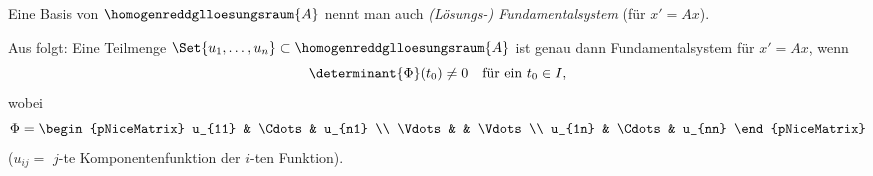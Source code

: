 \begin{definition*}
  Eine Basis von \( \homogenreddglloesungsraum{A} \) nennt man auch \emph{(Lösungs-) Fundamentalsystem} (für \( x'=Ax \)).
\end{definition*}
\begin{bemerkung*}
  Aus  folgt: Eine Teilmenge \( \Set{u_1,\dotsc,u_n}\subset \homogenreddglloesungsraum{A} \) ist genau dann Fundamentalsystem für \( x'=Ax \), wenn
  \begin{equation*}
    \determinant{\Phi}(t_0)\neq 0\quad \text{für ein }t_0\in I,
  \end{equation*}
  wobei
  \begin{equation*}
    \Phi=\begin{pNiceMatrix} u_{11} & \Cdots & u_{n1} \\ \Vdots &  & \Vdots \\ u_{1n} & \Cdots & u_{nn} \end{pNiceMatrix}
  \end{equation*}
  (\( u_{ij}= \) \( j \)-te Komponentenfunktion der \( i \)-ten Funktion).
\end{bemerkung*}
